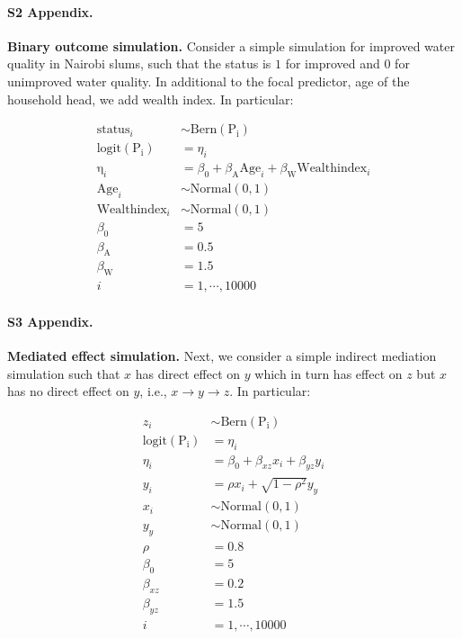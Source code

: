\documentclass[10pt,letterpaper]{article}
\begin{document}
\paragraph*{S2 Appendix.}
\label{S2_Appendix}
{\bf Binary outcome simulation.} Consider a simple simulation for improved water quality in Nairobi slums, such that the status is $1$ for improved and $0$ for unimproved water quality. In additional to the focal predictor, age of the household head, we add wealth index. In particular:

\begin{align}\label{sim:glm_two_pred}
\mathrm{status}_i &\sim \mathrm{Bern}(\mathrm{P_i}) \nonumber\\
\mathrm{logit}(\mathrm{P_i}) &= \eta_i \nonumber\\
\mathrm{\eta}_i &= \beta_0 + \beta_{\mathrm{A}}\mathrm{Age}_i + \beta_{\mathrm{W}}\mathrm{Wealthindex}_i \nonumber\\
\mathrm{Age}_i &\sim \mathrm{Normal}(0, 1) \nonumber\\
\mathrm{Wealthindex}_i &\sim \mathrm{Normal}(0, 1) \nonumber\\
\beta_0 &= 5 \nonumber\\
\beta_{\mathrm{A}} &= 0.5 \nonumber\\
\beta_{\mathrm{W}} &= 1.5 \nonumber\\
i &= 1,\cdots, 10000
\end{align}

\paragraph*{S3 Appendix.}
\label{S3_Appendix}
{\bf Mediated effect simulation.} Next, we consider a simple indirect mediation simulation such that $x$ has direct effect on $y$ which in turn has effect on $z$ but $x$ has no direct effect on $y$, i.e., $x \rightarrow y \rightarrow z$. In particular:

\begin{align}\label{sim:simple_mediate}
z_i &\sim \mathrm{Bern}(\mathrm{P_i}) \nonumber\\
\mathrm{logit}(\mathrm{P_i}) &= \eta_i \nonumber\\
\eta_i &= \beta_0 + \beta_{xz} x_i + \beta_{yz} y_i \nonumber\\
y_i &= \rho x_i + \sqrt{1-\rho^2} y_y \nonumber\\
x_i &\sim \mathrm{Normal(0, 1)} \nonumber\\
y_y &\sim \mathrm{Normal(0, 1)} \nonumber\\
\rho &= 0.8 \nonumber\\
\beta_0 &= 5 \nonumber\\
\beta_{xz} &= 0.2 \nonumber\\
\beta_{yz} &= 1.5 \nonumber\\
i &= 1,\cdots, 10000
\end{align}
\end{document}
